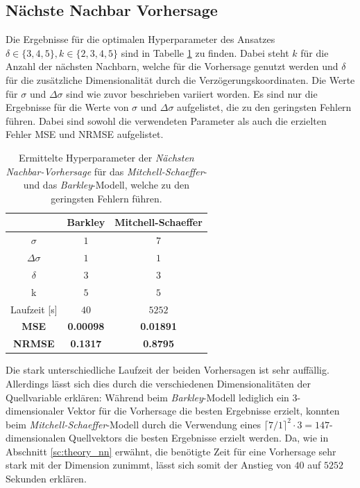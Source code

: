 \subsection{Nächste Nachbar Vorhersage}
Die Ergebnisse für die optimalen Hyperparameter des Ansatzes $\delta \in \{3,4,5\}, k \in \{2, 3, 4, 5\}$ sind in Tabelle \ref{tab:exp_cross_nn_results} zu finden. Dabei steht $k$ für die Anzahl der nächsten Nachbarn, welche für die Vorhersage genutzt werden und $\delta$ für die zusätzliche Dimensionalität durch die Verzögerungskoordinaten. Die Werte für $\sigma$ und $\Delta \sigma$ sind wie zuvor beschrieben variiert worden. Es sind nur die Ergebnisse für die Werte von $\sigma$ und $\Delta \sigma$ aufgelistet, die zu den geringsten Fehlern führen. Dabei sind sowohl die verwendeten Parameter als auch die erzielten Fehler MSE und NRMSE aufgelistet.
\begin{table}[h]
	\centering

	\begin{tabular}{ccc}
		\hline		
		\multicolumn{1}{c}{} & Barkley & Mitchell-Schaeffer \\ 
		\hline 
		\rule[-1ex]{0pt}{2.5ex} $\sigma$ & $1$ & $7$ \\ 
		\rule[-1ex]{0pt}{2.5ex} $\Delta \sigma$ & $1$ & $1$ \\ 
		\rule[-1ex]{0pt}{2.5ex} $\delta$ & $3$ & $3$ \\ 
		\rule[-1ex]{0pt}{2.5ex} k & $5$ & $5$ \\ 
		\rule[-1ex]{0pt}{2.5ex} Laufzeit [s] & $40$ & $5252$ \\ 
		\rule[-1ex]{0pt}{2.5ex} \textbf{MSE} & \textbf{0.00098} & \textbf{0.01891} \\ 
		\rule[-1ex]{0pt}{2.5ex} \textbf{NRMSE} & \textbf{0.1317} & \textbf{0.8795} \\ 
		\hline 
	\end{tabular} 

	\caption{Ermittelte Hyperparameter der \textit{Nächsten Nachbar-Vorhersage} für das \textit{Mitchell-Schaeffer}- und das \textit{Barkley}-Modell, welche zu den geringsten Fehlern führen.}
\label{tab:exp_cross_nn_results}
\end{table} 

Die stark unterschiedliche Laufzeit der beiden Vorhersagen ist sehr auffällig. Allerdings lässt sich dies durch die verschiedenen Dimensionalitäten der Quellvariable erklären: Während beim \textit{Barkley}-Modell lediglich ein $3$-dimensionaler Vektor für die Vorhersage die besten Ergebnisse erzielt, konnten beim \textit{Mitchell-Schaeffer}-Modell durch die Verwendung eines $\lceil 7/1 \rceil^2 \cdot 3 = 147$-dimensionalen Quellvektors die besten Ergebnisse erzielt werden. Da, wie in Abschnitt \ref{sc:theory_nn} erwähnt, die benötigte Zeit für eine Vorhersage sehr stark mit der Dimension zunimmt, lässt sich somit der Anstieg von $40$ auf $5252$ Sekunden erklären.

